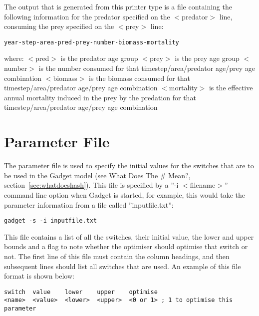 \documentclass [a4paper, 10pt]{book}
\begin{document}
The output that is generated from this printer type is a file containing the following information for the predator specified on the $<$predator$>$ line, consuming the prey specified on the $<$prey$>$ line:

{\small\begin{verbatim}
year-step-area-pred-prey-number-biomass-mortality
\end{verbatim}}

where:\newline
$<$pred$>$ is the predator age group\newline
$<$prey$>$ is the prey age group\newline
$<$number$>$ is the number consumed for that timestep/area/predator age/prey age combination\newline
$<$biomass$>$ is the biomass consumed for that timestep/area/predator age/prey age combination\newline
$<$mortality$>$ is the effective annual mortality induced in the prey by the predation for that timestep/area/predator age/prey age combination

\chapter{Parameter File}\label{chap:param}
The parameter file is used to specify the initial values for the switches that are to be used in the Gadget model (see What Does The \# Mean?, section~\ref{sec:whatdoeshash}).  This file is specified by a ''-i $<$filename$>$'' command line option when Gadget is started, for example, this would take the parameter information from a file called ''inputfile.txt'':

{\small\begin{verbatim}
gadget -s -i inputfile.txt
\end{verbatim}}

This file contains a list of all the switches, their initial value, the lower and upper bounds and a flag to note whether the optimiser should optimise that switch or not.  The first line of this file must contain the column headings, and then subsequent lines should list all switches that are used.  An example of this file format is shown below:

{\small\begin{verbatim}
switch  value    lower    upper    optimise
<name>  <value>  <lower>  <upper>  <0 or 1> ; 1 to optimise this parameter
\end{verbatim}}
\end{document}

